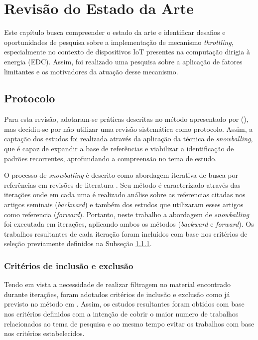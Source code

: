 \chapter{Revisão do Estado da Arte}
\label{cap:cap3}

Este capítulo busca compreender o estado da arte e identificar desafios e oportunidades de pesquisa sobre a implementação de mecanismo \textit{throttling}, especialmente no contexto de dispositivos \acs{IoT} presentes na computação dirigia à energia (\acl{EDC}). Assim, foi realizado uma pesquisa sobre a aplicação de fatores limitantes e os motivadores da atuação desse mecanismo.


\section{Protocolo}
Para esta revisão, adotaram-se práticas descritas no método apresentado por \citeauthor{kitchenham_systematic_2009} (\citeyear{kitchenham_systematic_2009}), mas decidiu-se por não utilizar uma revisão sistemática como protocolo. Assim, a captação dos estudos foi realizada através da aplicação da técnica de \textit{snowballing}, que é capaz de expandir a base de referências e viabilizar a identificação de padrões recorrentes, aprofundando a compreensão no tema de estudo.

O processo de \textit{snowballing} é descrito como abordagem iterativa de busca por referências em revisões de literatura \cite{wohlin_guidelines_2014}. Seu método é caracterizado através das iterações onde em cada uma é realizado análise sobre as referencias citadas nos artigos seminais (\textit{backward}) e também dos estudos que utilizaram esses artigos como referencia (\textit{forward}). Portanto, neste trabalho a abordagem de \textit{snowballing} foi executada em iterações, aplicando ambos os métodos (\textit{backward} e \textit{forward}). Os trabalhos resultantes de cada iteração  foram incluídos com base nos critérios de seleção previamente definidos na Subseção \ref{cap3:criteriosinclusaoexclusao}.




\subsection{Critérios de inclusão e exclusão} 
\label{cap3:criteriosinclusaoexclusao}

Tendo em vista a necessidade de realizar filtragem no material encontrado durante iterações, foram adotados critérios de inclusão e exclusão como já previsto no método em  \cite{wohlin_guidelines_2014}. Assim, os estudos resultantes foram obtidos com base nos critérios definidos com a intenção de cobrir o maior numero de trabalhos relacionados ao tema de pesquisa e ao mesmo tempo evitar os trabalhos com base nos critérios estabelecidos.

